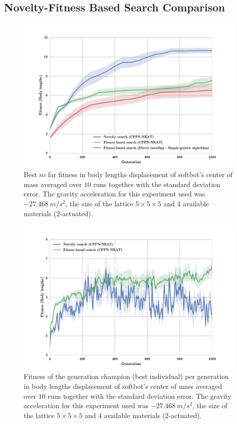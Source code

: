 \clearpage
\subsection{Novelty-Fitness Based Search Comparison}

\begin{figure}[h!]
\centering
\includegraphics[width=1.0\textwidth]{../Figures/Results/FitvsNovVsDirSize5.pdf}
\caption{Best so far fitness in body lengths displacement of softbot's center of mass averaged over $10$ runs together with the standard deviation error. The gravity acceleration for this experiment used was $-27.468\   m/s^2$, the size of the lattice $5\times 5\times5$ and $4$ available materials ($2$-actuated).}
\label{fig:FitvsNovVsDirSize5}
\end{figure}

\begin{figure}[h!]
\centering
\includegraphics[width=1.0\textwidth]{../Figures/Results/AvgGenerChampNoveltyFitnessSize5.pdf}
\caption{Fitness of the generation champion (best individual) per generation in body lengths displacement of softbot's center of mass averaged over $10$ runs together with the standard deviation error. The gravity acceleration for this experiment used was $-27.468\   m/s^2$, the size of the lattice $5\times 5\times5$ and $4$ available materials ($2$-actuated).}
\label{fig:AvgGenerChampNoveltyFitnessSize5}
\end{figure}

